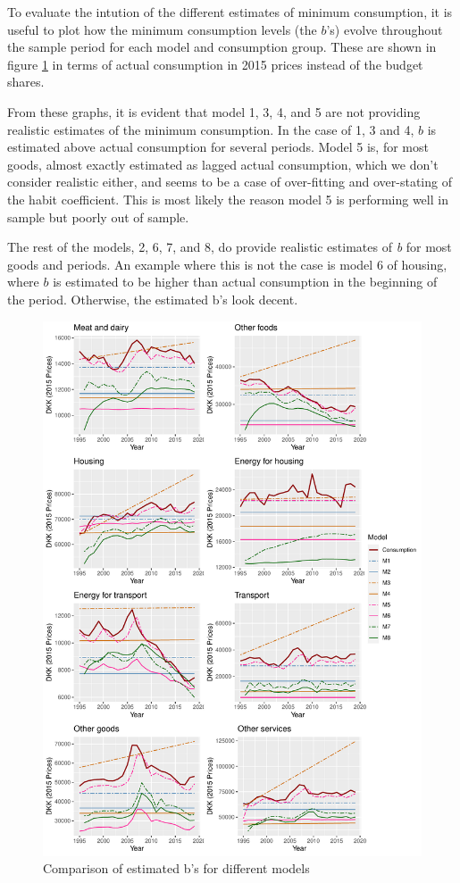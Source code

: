 To evaluate the intution of the different estimates of minimum consumption, it is useful to plot how the minimum consumption levels (the $b$'s) evolve  throughout the sample period for each model and consumption group. These are shown in figure \ref{samlignb} in terms of actual consumption in 2015 prices instead of the budget shares. 

From these graphs, it is evident that model 1, 3, 4, and 5 are not providing realistic estimates of the minimum consumption. In the case of 1, 3 and 4, $b$ is estimated above actual consumption for several periods.  Model 5 is, for most goods, almost exactly estimated as lagged actual consumption, which we don't consider realistic either, and seems to be a case of over-fitting and over-stating of the habit coefficient. This is most likely the reason model 5 is performing well in sample but poorly out of sample. 

The rest of the models, 2, 6, 7, and 8, do provide realistic estimates of \textit{b} for most goods and periods. An example where this is not the case is model 6 of housing, where $b$ is estimated to be higher than actual consumption in the beginning of the period. Otherwise, the estimated b's look decent.
\begin{figure}[H]
\centering
\caption{Comparison of estimated b's for different models}
\label{samlignb}
\includegraphics[width=.9\textwidth]{Figures/plot_min_ny.pdf}
\captionsetup{singlelinecheck=off,size=scriptsize}
\setlength{\captionmargin}{10pt}
\end{figure}

